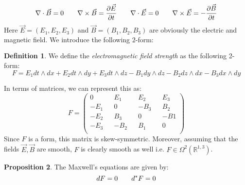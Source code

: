 \documentclass[12pt,a4paper]{report}
\theoremstyle{definition}
\newtheorem{Def}{Definition}[chapter]
\theoremstyle{Theorem}
\newtheorem{Prop}[Def]{Proposition}
\theoremstyle{definition}
\theoremstyle{definition}
\begin{document}
	\begin{equation}\label{M.E.}
		\nabla \cdot \vec{B} =0 \hspace{20 pt} \nabla \times \vec{B}={\partial \vec{E}\over \partial t}\hspace{20 pt}\nabla \cdot \vec{E} =0 \hspace{20 pt} \nabla \times \vec{E}=-{\partial \vec{B}\over \partial t}
	\end{equation}
	Here $\vec{E}=(E_1,E_2,E_3)$ and $\vec{B}=(B_1,B_2,B_3)$ are obviously the electric and magnetic field.
	We introduce the following $2$-form:
	\begin{Def}
		We define the \textit{electromagnetic  field strength} as the following 2-form:
		$$F=E_1 dt\wedge dx+E_2 dt\wedge dy+E_3 dt\wedge dz-B_1 dy\wedge dz-B_2 dz\wedge dx-B_3 dx\wedge dy$$
	\end{Def}
	In terms of matrices, we can represent this as:
	$$F=\begin{pmatrix}
		0 && E_1 && E_2 && E_3\\
		-E_1 && 0 && -B_3 && B_2\\
		-E_2 &&  B_3 && 0 && -B1\\
		-E_3 && -B_2 && B_1 && 0\\ 
	\end{pmatrix}$$
	Since $F$ is a form, this matrix is skew-symmetric. Moreover, assuming that the fields $\vec{E},\vec{B}$ are smooth, $F$ is clearly smooth as well i.e. $F\in\Omega^2(\mathbb{R}^{1,3})$.
	\begin{Prop}
		The Maxwell's equations are given by:
		$$dF=0\hspace{20 pt} d^*F=0$$
	\end{Prop}
\end{document}
